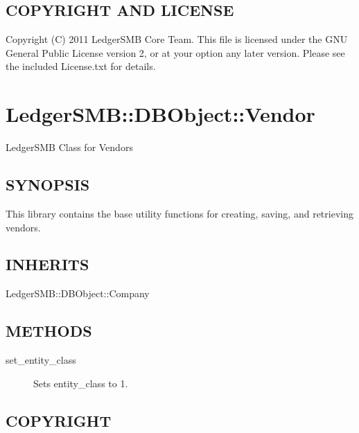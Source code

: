 \begin{description}
\begin{description}
\begin{description}
\begin{description}
\begin{description}
\begin{description}
\begin{description}
\begin{description}
\begin{description}
\begin{description}
\subsection*{COPYRIGHT AND LICENSE\label{LedgerSMB::DBObject::Budget_COPYRIGHT_AND_LICENSE}}


Copyright (C) 2011 LedgerSMB Core Team.  This file is licensed under the GNU 
General Public License version 2, or at your option any later version.  Please
see the included License.txt for details.

\section{LedgerSMB::DBObject::Vendor\label{LedgerSMB::DBObject::Vendor}}


LedgerSMB Class for Vendors

\subsection*{SYNOPSIS\label{LedgerSMB::DBObject::Vendor_SYNOPSIS}}


This library contains the base utility functions for creating, saving, and
retrieving vendors.

\subsection*{INHERITS\label{LedgerSMB::DBObject::Vendor_INHERITS}}


LedgerSMB::DBObject::Company

\subsection*{METHODS\label{LedgerSMB::DBObject::Vendor_METHODS}}
\begin{description}

\item[{set\_entity\_class}] \mbox{}

Sets entity\_class to 1.

\end{description}
\subsection*{COPYRIGHT\label{LedgerSMB::DBObject::Vendor_COPYRIGHT}}



\end{description}
\end{description}
\end{description}
\end{description}
\end{description}
\end{description}
\end{description}
\end{description}
\end{description}
\end{description}
